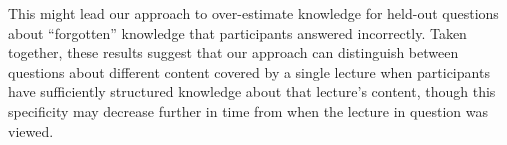 \documentclass[10pt]{article}
\begin{document}
This might lead our approach to over-estimate knowledge for held-out questions about ``forgotten'' knowledge that participants answered incorrectly.
Taken together, these results suggest that our approach can distinguish between questions about different content covered by a single lecture when participants have sufficiently structured knowledge about that lecture's content, though this specificity may decrease further in time from when the lecture in question was viewed.
\end{document}
